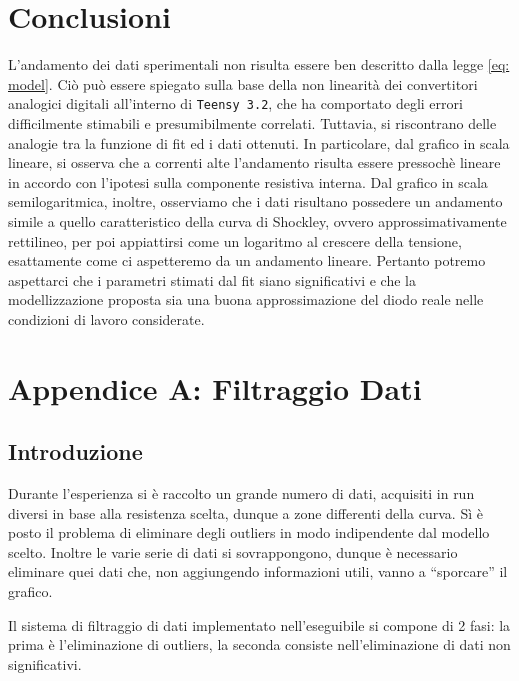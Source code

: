 \documentclass{article}[a4paper, oneside, 11pt]
\begin{document}
\section{Conclusioni}
L'andamento dei dati sperimentali non risulta essere ben descritto dalla legge
\eqref{eq: model}. Ciò può essere spiegato sulla base della non linearità dei
convertitori analogici digitali all'interno di \verb+Teensy 3.2+, che ha 
comportato
degli errori difficilmente stimabili e presumibilmente correlati. Tuttavia, si
riscontrano delle analogie tra la funzione di fit ed i dati ottenuti. In
particolare, dal grafico in scala lineare, si osserva che a correnti alte
l'andamento risulta essere pressoch\`e lineare in accordo con l'ipotesi sulla
componente resistiva interna. Dal grafico in scala semilogaritmica, inoltre, osserviamo
che i dati risultano possedere un andamento simile a quello caratteristico 
della curva di Shockley, ovvero approssimativamente rettilineo, per poi appiattirsi come un logaritmo al crescere
della tensione, esattamente come ci aspetteremo da un andamento lineare.
Pertanto potremo aspettarci che i parametri stimati dal fit siano significativi e che la modellizzazione proposta sia una buona approssimazione del diodo reale nelle condizioni di lavoro considerate.

\section{Appendice A: Filtraggio Dati}\label{app: A}

\subsection{Introduzione}
Durante l’esperienza si è raccolto un grande numero di dati, acquisiti in
run diversi in base alla resistenza scelta, dunque a zone differenti della
curva. Sì è posto il problema di eliminare degli outliers in modo
indipendente dal modello scelto. Inoltre le varie serie di dati si
sovrappongono, dunque è necessario eliminare quei dati che, non aggiungendo
informazioni utili, vanno a “sporcare” il grafico.

Il sistema di filtraggio di dati implementato nell'eseguibile si compone di 2
fasi: la prima è l’eliminazione di outliers, la seconda consiste
nell'eliminazione di dati non significativi.
\end{document}
